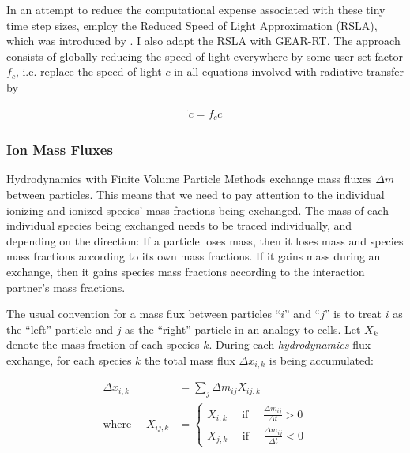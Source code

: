 In an attempt to reduce the computational expense associated with these tiny time step sizes,
\cite{ramses-rt13} employ the Reduced Speed of Light Approximation (RSLA), which was introduced by
\cite{gnedinMultidimensionalCosmologicalRadiative2001}. I also adapt the RSLA with GEAR-RT. The
approach consists of globally reducing the speed of light everywhere by some user-set factor $f_c$,
i.e. replace the speed of light $c$ in all equations involved with radiative transfer by

\begin{align}
    \tilde{c} = f_c c
\end{align}














\subsubsection{Ion Mass Fluxes}

Hydrodynamics with Finite Volume Particle Methods exchange mass fluxes $\Delta m$ between particles.
This means that we need to pay attention to the individual ionizing and ionized species' mass
fractions being exchanged. The mass of each individual species being exchanged needs to be traced
individually, and depending on the direction: If a particle loses mass, then it loses mass and
species mass fractions according to its own mass fractions. If it gains mass during an exchange,
then it gains species mass fractions according to the interaction partner's mass fractions.

The usual convention for a mass flux between particles ``$i$'' and ``$j$'' is to treat $i$ as the
``left'' particle and $j$ as the ``right'' particle in an analogy to cells. Let $X_k$ denote the
mass fraction of each species $k$. During each \emph{hydrodynamics} flux exchange, for each species
$k$ the total mass flux $\Delta x_{i,k}$ is being accumulated:

\begin{align}
\Delta x_{i,k} &= \sum_j \Delta m_{ij} X_{ij,k}\\
\text{where }\quad X_{ij,k} &=
	\begin{cases}
		X_{i,k} \quad \text{ if } \quad \frac{\Delta m_{ij}}{\Delta t} > 0 \\
		X_{j,k} \quad \text{ if } \quad \frac{\Delta m_{ij}}{\Delta t} < 0
	\end{cases}
\end{align}

